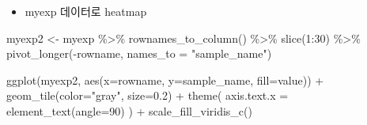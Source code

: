 \documentclass[
]{book}
\newenvironment{Shaded}{\begin{snugshade}}{\end{snugshade}}
\newcommand{\AttributeTok}[1]{\textcolor[rgb]{0.77,0.63,0.00}{#1}}
\newcommand{\DecValTok}[1]{\textcolor[rgb]{0.00,0.00,0.81}{#1}}
\newcommand{\FloatTok}[1]{\textcolor[rgb]{0.00,0.00,0.81}{#1}}
\newcommand{\FunctionTok}[1]{\textcolor[rgb]{0.00,0.00,0.00}{#1}}
\newcommand{\NormalTok}[1]{#1}
\newcommand{\OtherTok}[1]{\textcolor[rgb]{0.56,0.35,0.01}{#1}}
\newcommand{\SpecialCharTok}[1]{\textcolor[rgb]{0.00,0.00,0.00}{#1}}
\newcommand{\StringTok}[1]{\textcolor[rgb]{0.31,0.60,0.02}{#1}}
\providecommand{\tightlist}{%
  \setlength{\itemsep}{0pt}\setlength{\parskip}{0pt}}
\begin{document}
\begin{Shaded}
\end{Shaded}

\begin{itemize}
\tightlist
\item
  myexp 데이터로 heatmap
\end{itemize}

\begin{Shaded}
\begin{Highlighting}[]
\NormalTok{myexp2 }\OtherTok{\textless{}{-}}\NormalTok{ myexp }\SpecialCharTok{\%\textgreater{}\%} 
  \FunctionTok{rownames\_to\_column}\NormalTok{() }\SpecialCharTok{\%\textgreater{}\%} 
  \FunctionTok{slice}\NormalTok{(}\DecValTok{1}\SpecialCharTok{:}\DecValTok{30}\NormalTok{) }\SpecialCharTok{\%\textgreater{}\%} 
  \FunctionTok{pivot\_longer}\NormalTok{(}\SpecialCharTok{{-}}\NormalTok{rowname, }\AttributeTok{names\_to =} \StringTok{"sample\_name"}\NormalTok{) }
  



\FunctionTok{ggplot}\NormalTok{(myexp2, }\FunctionTok{aes}\NormalTok{(}\AttributeTok{x=}\NormalTok{rowname, }\AttributeTok{y=}\NormalTok{sample\_name, }\AttributeTok{fill=}\NormalTok{value)) }\SpecialCharTok{+}
  \FunctionTok{geom\_tile}\NormalTok{(}\AttributeTok{color=}\StringTok{"gray"}\NormalTok{, }\AttributeTok{size=}\FloatTok{0.2}\NormalTok{) }\SpecialCharTok{+} 
  \FunctionTok{theme}\NormalTok{(}
    \AttributeTok{axis.text.x =} \FunctionTok{element\_text}\NormalTok{(}\AttributeTok{angle=}\DecValTok{90}\NormalTok{)}
\NormalTok{  ) }\SpecialCharTok{+}
  \FunctionTok{scale\_fill\_viridis\_c}\NormalTok{()}
  
  
\end{Highlighting}
\end{Shaded}
\end{document}
